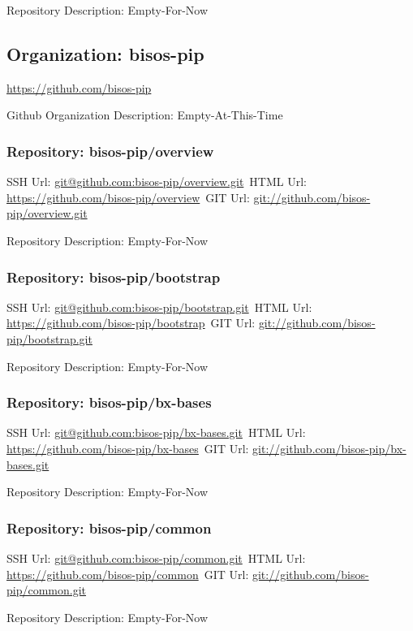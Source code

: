 Repository Description: Empty-For-Now

\subsection{Organization: bisos-pip}

\url{https://github.com/bisos-pip}

Github Organization Description: Empty-At-This-Time

\subsubsection{Repository: bisos-pip/overview}

SSH Url:  \url{git@github.com:bisos-pip/overview.git}\
HTML Url: \url{https://github.com/bisos-pip/overview}\
GIT Url:  \url{git://github.com/bisos-pip/overview.git}

Repository Description: Empty-For-Now

\subsubsection{Repository: bisos-pip/bootstrap}

SSH Url:  \url{git@github.com:bisos-pip/bootstrap.git}\
HTML Url: \url{https://github.com/bisos-pip/bootstrap}\
GIT Url:  \url{git://github.com/bisos-pip/bootstrap.git}

Repository Description: Empty-For-Now

\subsubsection{Repository: bisos-pip/bx-bases}

SSH Url:  \url{git@github.com:bisos-pip/bx-bases.git}\
HTML Url: \url{https://github.com/bisos-pip/bx-bases}\
GIT Url:  \url{git://github.com/bisos-pip/bx-bases.git}

Repository Description: Empty-For-Now

\subsubsection{Repository: bisos-pip/common}

SSH Url:  \url{git@github.com:bisos-pip/common.git}\
HTML Url: \url{https://github.com/bisos-pip/common}\
GIT Url:  \url{git://github.com/bisos-pip/common.git}

Repository Description: Empty-For-Now

